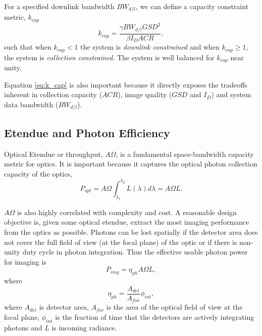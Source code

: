 \documentclass[10pt,journal]{IEEEtran}  %
\begin{document}
For a specified downlink bandwidth $BW_{d/l}$, we can define a capacity constraint metric, $k_{cap}$
\begin{equation}
\label{eq:k_cap}
k_{cap} = \frac{\gamma BW_{d/l} GSD^2}{\beta I_D ACR},
\end{equation}
such that when $k_{cap} < 1$ the system is \emph{downlink constrained} and when $k_{cap} \geq 1$, the system is \emph{collection constrained}.  The system is well balanced for $k_{cap}$ near unity.  

Equation \eqref{eq:k_cap} is also  important because it directly exposes the tradeoffs inherent in collection capacity ($ACR$), image quality ($GSD$ and $I_D$) and system data bandwidth ($BW_{d/l}$).



\subsection{Etendue and Photon Efficiency}
\label{sec:entendue}

Optical Etendue or throughput, $A \Omega$, is a fundamental space-bandwidth capacity metric for optics.  It is important because it captures the optical photon collection capacity of the optics,
\begin{equation}
    P_{opt} = A\Omega \int_{\lambda_1}^{\lambda_2}L(\lambda) d\lambda = A\Omega L.
\end{equation}

$A\Omega$ is also highly correlated with complexity and cost.  A reasonable design objective is, given some optical etendue, extract the most imaging performance from the optics as possible.
Photons can be lost spatially if the detector area does not cover the full field of view (at the focal plane) of the optic or if there is non-unity duty cycle in photon integration.  Thus the effective usable photon power for imaging is
\begin{equation}
    P_{img} = \eta_{ph} A \Omega L ,
\end{equation}
where
\begin{equation}
    \eta_{ph} = \frac{A_{det}}{A_{fov}} \phi_{int},
\end{equation}
where $A_{det}$ is detector area, $A_{fov}$ is the area of the optical field of view at the focal plane, $\phi_{int}$ is the fraction of time that the detectors are actively integrating photons and $L$ is incoming radiance.
\end{document}
